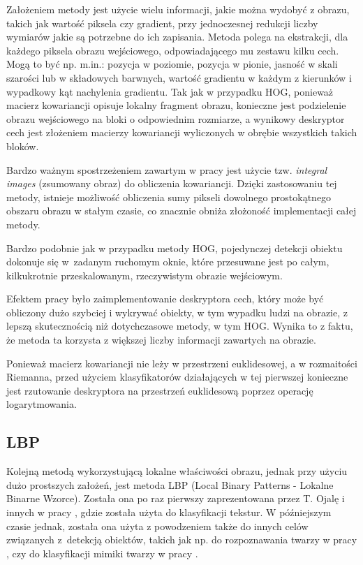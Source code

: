 Założeniem metody jest użycie wielu informacji, jakie można wydobyć z obrazu, takich jak wartość piksela czy gradient, przy jednoczesnej redukcji liczby wymiarów jakie są potrzebne do ich zapisania. Metoda polega na ekstrakcji, dla każdego piksela obrazu wejściowego, odpowiadającego mu zestawu kilku cech. Mogą to być np. m.in.: pozycja w poziomie, pozycja w pionie, jasność w skali szarości lub w składowych barwnych, wartość gradientu w każdym z kierunków i wypadkowy kąt nachylenia gradientu.
Tak jak w przypadku HOG, ponieważ macierz kowariancji opisuje lokalny fragment obrazu, konieczne jest podzielenie obrazu wejściowego na bloki o odpowiednim rozmiarze, a wynikowy deskryptor cech jest złożeniem macierzy kowariancji wyliczonych w obrębie wszystkich takich bloków.

Bardzo ważnym spostrzeżeniem zawartym w pracy \cite{Tuzel06} jest użycie tzw. \textit{integral images} (zsumowany obraz) do obliczenia kowariancji. Dzięki zastosowaniu tej metody, istnieje możliwość obliczenia sumy pikseli dowolnego prostokątnego obszaru obrazu w stałym czasie, co znacznie obniża złożoność implementacji całej metody.

Bardzo podobnie jak w przypadku metody HOG, pojedynczej detekcji obiektu dokonuje się w~zadanym ruchomym oknie, które przesuwane jest po całym, kilkukrotnie przeskalowanym, rzeczywistym obrazie wejściowym.

Efektem pracy \cite{Tuzel06} było zaimplementowanie deskryptora cech, który może być obliczony dużo szybciej i wykrywać obiekty, w tym wypadku ludzi na obrazie, z lepszą skutecznością niż dotychczasowe metody, w tym HOG. Wynika to z faktu, że metoda ta korzysta z większej liczby informacji zawartych na obrazie.

Ponieważ macierz kowariancji nie leży w przestrzeni euklidesowej, a w rozmaitości Riemanna, przed użyciem klasyfikatorów działających w tej pierwszej konieczne jest rzutowanie deskryptora na przestrzeń euklidesową poprzez operację logarytmowania.

\subsection{LBP}
Kolejną metodą wykorzystującą lokalne właściwości obrazu, jednak przy użyciu dużo prostszych założeń, jest metoda LBP (Local Binary Patterns - Lokalne Binarne Wzorce). Została ona po raz pierwszy zaprezentowana przez T. Ojalę i innych w pracy \cite{Ojala96}, gdzie została użyta do klasyfikacji tekstur. W późniejszym czasie jednak, została ona użyta z powodzeniem także do innych celów związanych z~detekcją obiektów, takich jak np. do rozpoznawania twarzy w pracy \cite{Ahonen06}, czy do klasyfikacji mimiki twarzy w pracy \cite{Zhao07}.

